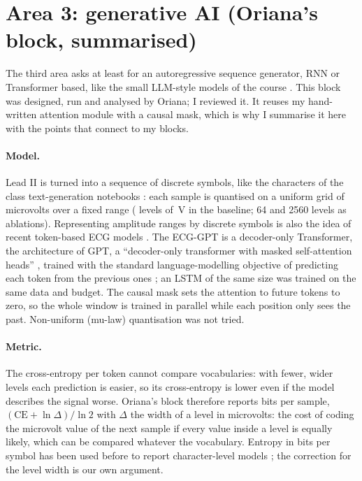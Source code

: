 \section{Area 3: generative AI (Oriana's block, summarised)}\label{sec:generative}

The third area asks at least for an autoregressive sequence generator, RNN or Transformer based, like the
small LLM-style models of the course \cite{course_message_2011}. This block was designed, run and
analysed by Oriana; I reviewed it. It reuses my hand-written attention module with a causal mask, which
is why I summarise it here with the points that connect to my blocks.

\paragraph{Model.} Lead II is turned into a sequence of discrete symbols, like the characters of the class
text-generation notebooks \cite{course_nb_sampling}: each sample is quantised on a uniform grid of
microvolts over a fixed range (\generativeVocabBase{} levels of \generativeDeltaUvBase\,\textmu V in the
baseline; 64 and 2560 levels as ablations). Representing amplitude ranges by discrete symbols is also the
idea of recent token-based ECG models \cite[p.~2]{han2025ecgbyte}. The ECG-GPT is a decoder-only Transformer, the
architecture of GPT, a ``decoder-only transformer with masked self-attention heads''
\cite[p.~5]{radford2018improving}, trained with the standard language-modelling objective of predicting each
token from the previous ones \cite[p.~3]{radford2018improving}; an LSTM of the same size was trained on the same
data and budget. The causal mask sets the attention to future tokens to zero, so the whole window is
trained in parallel while each position only sees the past. Non-uniform (mu-law) quantisation was not
tried.

\paragraph{Metric.} The cross-entropy per token cannot compare vocabularies: with fewer, wider levels each
prediction is easier, so its cross-entropy is lower even if the model describes the signal worse.
Oriana's block therefore reports bits per sample, $(\mathrm{CE} + \ln \Delta)/\ln 2$ with $\Delta$ the
width of a level in microvolts: the cost of coding the microvolt value of the next sample if every value
inside a level is equally likely, which can be compared whatever the vocabulary. Entropy in bits per symbol has been used before to report character-level models
\cite[p.~8]{pascanu2013difficulty}; the correction for the level width is our own argument.

